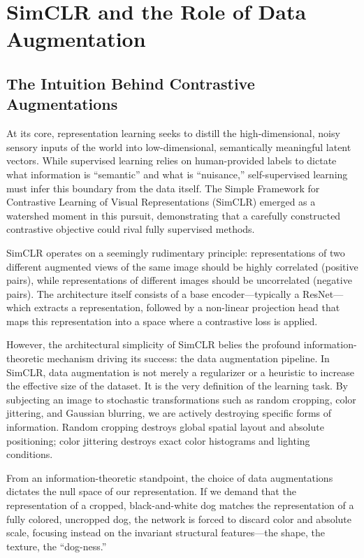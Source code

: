 \chapter{SimCLR and the Role of Data Augmentation}
\label{ch:simclr}

\section{The Intuition Behind Contrastive Augmentations}

At its core, representation learning seeks to distill the high-dimensional, noisy sensory inputs of the world into low-dimensional, semantically meaningful latent vectors. While supervised learning relies on human-provided labels to dictate what information is ``semantic'' and what is ``nuisance,'' self-supervised learning must infer this boundary from the data itself. The Simple Framework for Contrastive Learning of Visual Representations (SimCLR) emerged as a watershed moment in this pursuit, demonstrating that a carefully constructed contrastive objective could rival fully supervised methods.

SimCLR operates on a seemingly rudimentary principle: representations of two different augmented views of the same image should be highly correlated (positive pairs), while representations of different images should be uncorrelated (negative pairs). The architecture itself consists of a base encoder---typically a ResNet---which extracts a representation, followed by a non-linear projection head that maps this representation into a space where a contrastive loss is applied. 

However, the architectural simplicity of SimCLR belies the profound information-theoretic mechanism driving its success: the data augmentation pipeline. In SimCLR, data augmentation is not merely a regularizer or a heuristic to increase the effective size of the dataset. It is the very definition of the learning task. By subjecting an image to stochastic transformations such as random cropping, color jittering, and Gaussian blurring, we are actively destroying specific forms of information. Random cropping destroys global spatial layout and absolute positioning; color jittering destroys exact color histograms and lighting conditions. 

From an information-theoretic standpoint, the choice of data augmentations dictates the null space of our representation. If we demand that the representation of a cropped, black-and-white dog matches the representation of a fully colored, uncropped dog, the network is forced to discard color and absolute scale, focusing instead on the invariant structural features---the shape, the texture, the ``dog-ness.'' 

